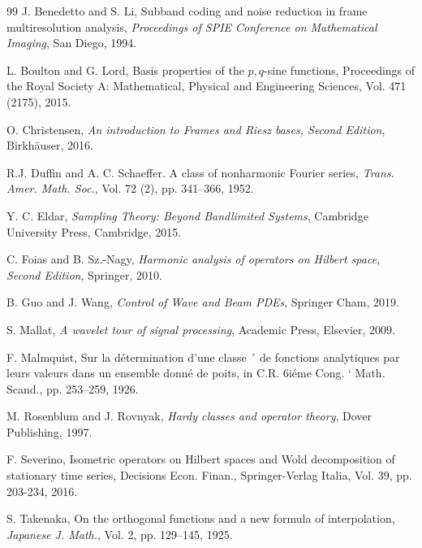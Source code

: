 \documentclass[10pt, reqno]{amsart}
\theoremstyle{definition}
\numberwithin{equation}{section}
\begin{document}
\begin{thebibliography}{99}
 J. Benedetto and S. Li, Subband coding and noise reduction in frame multiresolution analysis, {\it{Proceedings of SPIE Conference on Mathematical Imaging}}, San Diego, 1994.

 L. Boulton and G. Lord, Basis properties of the $p,q$-sine functions, Proceedings of the Royal Society A: Mathematical, Physical and Engineering Sciences, Vol. 471 (2175), 2015.

 O. Christensen, {\it{An introduction to Frames and Riesz bases, Second Edition}}, Birkh\"{a}user, 2016.

 R.J. Duffin and A. C. Schaeffer. A class of nonharmonic Fourier series,{\it{ Trans. Amer. Math. Soc.}}, Vol. 72 (2), pp. 341–366, 1952.

  Y. C. Eldar, {\it{Sampling Theory: Beyond Bandlimited Systems}}, Cambridge University Press, Cambridge, 2015.

 C. Foias and B. Sz.-Nagy, {\it{Harmonic analysis of operators on Hilbert space, Second Edition}}, Springer, 2010.

 B. Guo and J. Wang, {\it{Control of Wave and Beam PDEs}}, Springer Cham, 2019.

  S. Mallat, {\it{A wavelet tour of signal processing}}, Academic Press, Elsevier, 2009.

  F. Malmquist, Sur la d\'{e}termination d’une classe ´
de fonctions analytiques par leurs valeurs dans un
ensemble donn\'{e} de poits, in C.R. 6i\'{e}me Cong. `
Math. Scand., pp. 253–259, 1926.

 M. Rosenblum and J. Rovnyak, {\it{Hardy classes and operator theory}}, Dover Publishing, 1997.

  F. Severino, Isometric operators on Hilbert spaces and Wold
decomposition of stationary time series, Decisions Econ. Finan., Springer-Verlag Italia, Vol. 39, pp. 203-234, 2016.

 S. Takenaka, On the orthogonal functions and a new
formula of interpolation, {\it{Japanese J. Math.}}, Vol. 2, pp. 129–145, 1925.
\end{thebibliography}
\end{document}
